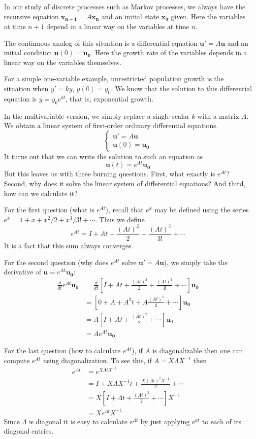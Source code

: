 \documentclass[11pt,oneside]{amsbook}
\theoremstyle{definition}
\theoremstyle{plain}
\theoremstyle{definition}
\theoremstyle{remark}
\numberwithin{equation}{section}
\numberwithin{figure}{section}
\begin{document}
In our study of discrete processes such as Markov processes, we always have the recursive equation $\mathbf{x_{n+1}}=A\mathbf{x_n}$ and an initial state $\mathbf{x_0}$ given. Here the variables at time $n+1$ depend in a linear way on the variables at time $n$.

The continuous analog of this situation is a differential equation $\mathbf{u}'=A\mathbf{u}$ and an initial condition $\mathbf{u}(0)=\mathbf{u_0}$. Here the growth rate of the variables depends in a linear way on the variables themselves.

For a simple one-variable example, unrestricted population growth is the situation when $y'=ky$, $y(0)=y_0$. We know that the solution to this differential equation is $y=y_0e^{kt}$, that is, exponential growth.

In the multivariable version, we simply replace a single scalar $k$ with a matrix $A$. We obtain a linear system of first-order ordinary differential equations.
\[\begin{cases}
    \mathbf{u}'=A\mathbf{u}\\
    \mathbf{u}(0)=\mathbf{u_0}
  \end{cases}
\]
It turns out that we can write the solution to such an equation as
\[\mathbf{u}(t)=e^{At}\mathbf{u_0}
\]
But this leaves us with three burning questions. First, what exactly is $e^{At}$? Second, why does it solve the linear system of differential equations? And third, how can we calculate it?

For the first question (what is $e^{At}$), recall that $e^x$ may be defined using the series $e^x=1+x+x^2/2+x^3/3!+\cdots$. Thus we define
\[e^{At}=I+At+\frac{(At)^2}{2}+\frac{(At)^3}{3!}+\cdots
\]
It is a fact that this sum always converges.

For the second question (why does $e^{At}$ solve $\mathbf{u}'=A\mathbf{u}$), we simply take the derivative of $\mathbf{u}=e^{At}\mathbf{u_0}$:
\begin{align*}
  \frac{d}{dt}e^{At}\mathbf{u_0}
  &=\frac{d}{dt}\left[
    I+At+\frac{(At)^2}{2}+\frac{(At)^3}{3!}+\cdots
    \right]\mathbf{u_0}\\
  &=\left[0+A+A^2t+A\frac{(At)^2}{2}+\cdots\right]
    \mathbf{u_0}\\
  &=A\left[I+At+\frac{(At)^2}{2}+\cdots\right]\mathbf{u}_0\\
  &=Ae^{At}\mathbf{u_0}
\end{align*}

For the last question (how to calculate $e^{At}$), if $A$ is diagonalizable then one can compute $e^{At}$ using diagonalization. To see this, if $A=X\Lambda X^{-1}$ then
\begin{align*}
  e^{At}&=e^{X\Lambda t X^{-1}}\\
        &=I+X\Lambda X^{-1}t+\frac{X(\Lambda t)^2X^{-1}}{2}+\cdots\\
        &=X\left[I+\Lambda t+\frac{(\Lambda t)^2}{2}+\cdots\right]X^{-1}\\
        &=Xe^{\Lambda t}X^{-1}
\end{align*}
Since $\Lambda$ is diagonal it is easy to calculate $e^{\Lambda t}$ by just applying $e^{at}$ to each of its diagonal entries.
\end{document}

